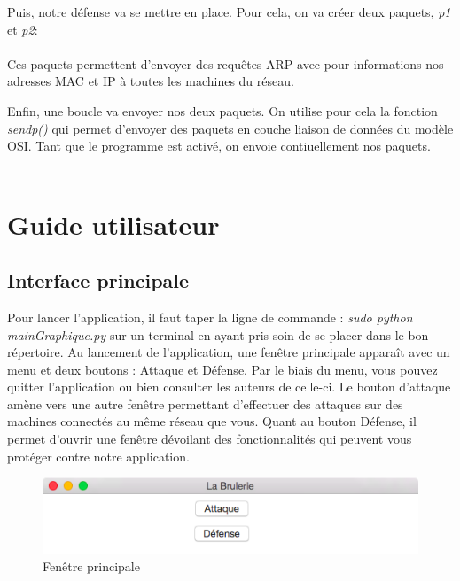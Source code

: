 \documentclass[11pt]{article}
\begin{document}
		Puis, notre défense va se mettre en place. Pour cela, on va créer deux paquets, \textit{p1} et \textit{p2}: ~\\
		~\\
		Ces paquets permettent d'envoyer des requêtes ARP avec pour informations nos adresses MAC et IP à toutes les machines du réseau.
		
		Enfin, une boucle va envoyer nos deux paquets. On utilise pour cela la fonction \textit{sendp()} qui permet d'envoyer des paquets en couche liaison de données du modèle OSI.
		Tant que le programme est activé, on envoie contiuellement nos paquets.~\\
		~\\	


\section{Guide utilisateur}
\subsection{Interface principale}
Pour lancer l'application, il faut taper la ligne de commande : \textit{sudo python mainGraphique.py} sur un terminal en ayant pris soin de se placer dans le bon répertoire. Au lancement de l'application, une fenêtre principale apparaît avec un menu et deux boutons : Attaque et Défense. Par le biais du menu, vous pouvez quitter l'application ou bien consulter les auteurs de celle-ci. Le bouton d'attaque amène vers une autre fenêtre permettant d'effectuer des attaques sur des machines connectés au même réseau que vous. Quant au bouton Défense, il permet d'ouvrir une fenêtre dévoilant des fonctionnalités qui peuvent vous protéger contre notre application.
\begin{figure}[!h]
\centering
\includegraphics[scale=0.6]{./Captures/fenetrePrinc.png}
\caption{Fenêtre principale}
\end{figure}
\end{document}
